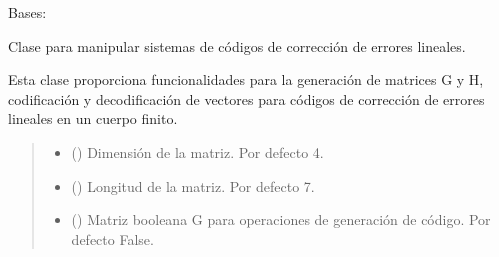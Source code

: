 \documentclass[letterpaper,10pt,english]{sphinxmanual}
\begin{document}
\begin{fulllineitems}
\label{\detokenize{myutils:myutils.bool.LinearSystECC}}
\pysigstartsignatures
{}
\pysigstopsignatures
\sphinxAtStartPar
Bases: 

\sphinxAtStartPar
Clase para manipular sistemas de códigos de corrección de errores lineales.

\sphinxAtStartPar
Esta clase proporciona funcionalidades para la generación de matrices G y H, codificación y decodificación de vectores para códigos de corrección de errores lineales en un cuerpo finito.
\begin{quote}\begin{description}
\begin{itemize}
\item {} 
\sphinxAtStartPar
{} (\sphinxstyleliteralemphasis{\sphinxupquote{, }}) \textendash{} Dimensión de la matriz. Por defecto 4.

\item {} 
\sphinxAtStartPar
{} (\sphinxstyleliteralemphasis{\sphinxupquote{, }}) \textendash{} Longitud de la matriz. Por defecto 7.

\item {} 
\sphinxAtStartPar
{} (\sphinxstyleliteralemphasis{\sphinxupquote{, }}) \textendash{} Matriz booleana G para operaciones de generación de código. Por defecto False.


\end{itemize}
\end{description}
\end{quote}
\end{fulllineitems}
\end{document}
